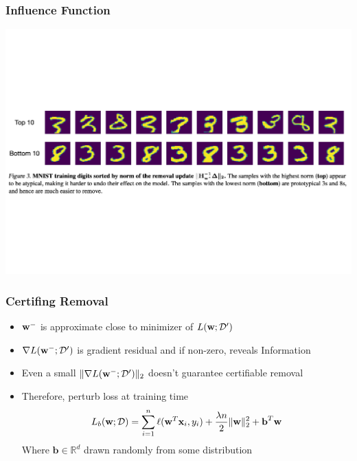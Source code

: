 \documentclass[pdf]{beamer}
\begin{document}
\begin{frame}
  \frametitle{Influence Function}
  \includegraphics[width=\textwidth]{images/influence functions.pdf}
\end{frame}

\begin{frame}
  \frametitle{Certifing Removal}
  \begin{itemize}
    \item $\textbf{w}^{-}$ is approximate close to minimizer of $L(\textbf{w};\mathcal{D}^{\prime})$
    \item $\nabla L(\textbf{w}^{-};\mathcal{D}^{\prime})$ is gradient residual and if non-zero, reveals Information
    \item Even a small $\|\nabla L(\textbf{w}^{-};\mathcal{D}^{\prime})\|_{2}$ doesn't guarantee certifiable removal 
    \item Therefore, perturb loss at training time 
    \[
      L_{b}(\textbf{w};\mathcal{D}) = \sum_{i=1}^{n}\ell(\textbf{w}^{T}\textbf{x}_{i},y_{i})+\frac{\lambda n}{2}\|\textbf{w}\|_{2}^{2} + \textbf{b}^{T}\textbf{w}
    \]
    Where $\textbf{b}\in \mathbb{R}^{d}$ drawn randomly from some distribution
  \end{itemize}

\end{frame}
\end{document}
